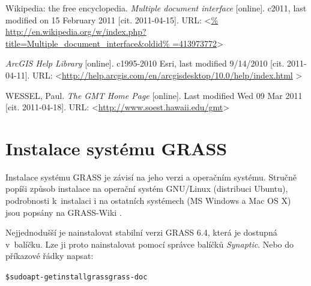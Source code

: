 \documentclass[a4paper,12pt,draft]{article}
\begin{document}
\begin{thebibliography}{99}
Wikipedia: the free encyclopedia. \textit{Multiple document interface}
[online]. c2011, last modified on 15 February 2011 [cit. 2011-04-15]. URL:
\textless\url{%
http://en.wikipedia.org/w/index.php?title=Multiple_document_interface&oldid%
=413973772}\textgreater




\textit{ArcGIS Help Library} [online].  c1995-2010 Esri, last modified
9/14/2010 [cit. 2011-04-11].
URL: \textless\url{http://help.arcgis.com/en/arcgisdesktop/10.0/help/index.html}
\textgreater

WESSEL, Paul. \textit{The GMT Home Page} [online]. Last modified Wed 09 Mar 2011
[cit. 2011-04-18].
URL: \textless\url{http://www.soest.hawaii.edu/gmt}\textgreater








\end{thebibliography}





\newpage
\appendix
\pagestyle{plain}

\section{Instalace systému GRASS}
\label{priloha:instalace}
Instalace systému GRASS je závisí na jeho verzi a operačním
systému. Stručně popíši způsob instalace na operační systém GNU/Linux
(distribuci Ubuntu), podrobnosti k~instalaci i na ostatních systémech
(MS Windows a Mac OS X) jsou popsány na GRASS-Wiki \cite{instalace}.

Nejjednodušší je nainstalovat stabilní verzi GRASS 6.4, která je
dostupná v~ba\-líčku. Lze ji proto nainstalovat pomocí správce balíčků
\emph{Synaptic}. Nebo do příkazové řádky napsat:
\begin{alltt}
{\footnotesize \$ sudo apt-get install grass grass-doc}
\end{alltt}
\end{document}
